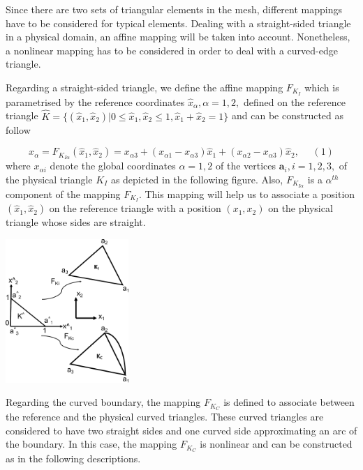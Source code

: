 Since there are two sets of triangular elements in the mesh, different mappings have to be considered for typical elements. Dealing with a straight-\/sided triangle in a physical domain, an affine mapping will be taken into account. Nonetheless, a nonlinear mapping has to be considered in order to deal with a curved-\/edge triangle.

Regarding a straight-\/sided triangle, we define the affine mapping $F_{K_{I}}$ which is parametrised by the reference coordinates $ \hat{x}_{\alpha}, \alpha = 1,2, $ defined on the reference triangle $ \hat{K} = \{(\hat{x}_1, \hat{x}_2) | 0 \leq \hat{x}_1, \hat{x}_2 \leq 1, \hat{x}_1 + \hat{x}_2 = 1 \} $ and can be constructed as follow

\[ x_{\alpha} = F_{K_{I\alpha}}(\hat{x}_{1},\hat{x}_{2}) = x_{\alpha 3} + (x_{\alpha 1} - x_{\alpha 3})\hat{x}_{1} + (x_{\alpha 2} - x_{\alpha 3})\hat{x}_{2}, \ \ \ \ \ \ (1) \] where $ x_{\alpha i}$ denote the global coordinates $ \alpha = 1,2 $ of the vertices $\mathbf{a}_{i}, i = 1,2,3,$ of the physical triangle $ K_I $ as depicted in the following figure. Also, $ F_{K_{I \alpha}} $ is a $ \alpha^{th} $ component of the mapping $ F_{K_{I}} $. This mapping will help us to associate a position $(\hat{x}_1,\hat{x}_2)$ on the reference triangle with a position $(x_{1},x_{2})$ on the physical triangle whose sides are straight.

 
\begin{DoxyImage}
\includegraphics[width=0.35\textwidth]{mapping}
\end{DoxyImage}


Regarding the curved boundary, the mapping $ F_{K_{C}} $ is defined to associate between the reference and the physical curved triangles. These curved triangles are considered to have two straight sides and one curved side approximating an arc of the boundary. In this case, the mapping $ F_{K_{C}} $ is nonlinear and can be constructed as in the following descriptions.

